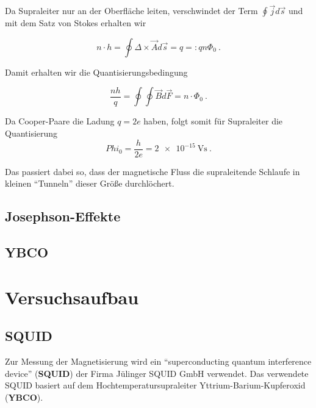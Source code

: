 \documentclass[a4paper,ngerman]{scrartcl}
\begin{document}
Da Supraleiter nur an der Oberfläche leiten, verschwindet der Term 
$\oint \vec{j}d\vec{s}$ und mit dem Satz von Stokes erhalten wir

\begin{equation}
  n \cdot h = \oint \Delta \times \vec{A} d\vec{s} =
  q =: q n \Phi_0 ~.
\end{equation}

Damit erhalten wir die Quantisierungsbedingung

\begin{equation}
  \frac{n h}{q} = \oint\oint\vec{B}d\vec{F} = n \cdot \Phi_0~.
\end{equation}

Da Cooper-Paare die Ladung $q = 2e$ haben, folgt somit für Supraleiter
die Quantisierung 
\begin{equation}
  \label{eq:phi0}
  Phi_0 = \frac{h}{2 e} = \SI{2e-15}{\volt\second}~.
\end{equation}

Das passiert dabei so, dass der magnetische Fluss die supraleitende
Schlaufe in kleinen "`Tunneln"' dieser Größe durchlöchert.

\subsection{Josephson-Effekte}
\label{ssec:josephson}


\subsection{YBCO}

 


\section{Versuchsaufbau}

\subsection{SQUID}

Zur Messung der Magnetisierung wird ein "`superconducting quantum interference device"' (\textbf{SQUID}) der Firma Jülinger SQUID GmbH verwendet. 
Das verwendete SQUID basiert auf dem Hochtemperatursupraleiter Yttrium-Barium-Kupferoxid (\textbf{YBCO}).
\end{document}
